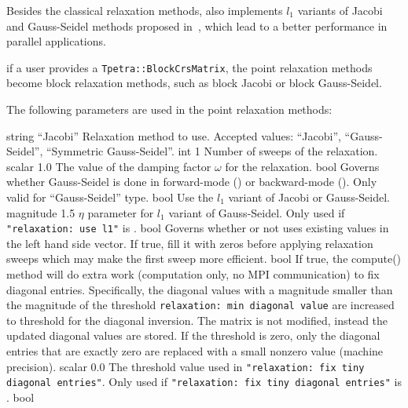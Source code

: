 Besides the classical relaxation methods, \ifpacktwo{} also implements $l_1$
variants of Jacobi and Gauss-Seidel methods proposed in~\cite{Baker2011}, which
lead to a better performance in parallel applications.

 if a user provides a \texttt{Tpetra::BlockCrsMatrix}, the point relaxation
methods become block relaxation methods, such as block Jacobi or block
Gauss-Seidel.

The following parameters are used in the point relaxation methods:

    {string}
    {``Jacobi''}
    {Relaxation method to use. Accepted values: ``Jacobi'',
     ``Gauss-Seidel'', ``Symmetric Gauss-Seidel''.}
    {int}
    {1}
    {Number of sweeps of the relaxation.}
    {scalar}
    {1.0}
    {The value of the damping factor $\omega$ for the relaxation.}
    {bool}
    {\false}
    {Governs whether Gauss-Seidel is done in forward-mode (\false) or
     backward-mode (\true). Only valid for ``Gauss-Seidel'' type.}
    {bool}
    {\false}
    {Use the $l_1$ variant of Jacobi or Gauss-Seidel.}
    {magnitude}
    {1.5}
    {$\eta$ parameter for $l_1$ variant of Gauss-Seidel. Only used if
     {\tt "relaxation: use l1"} is \true.}
    {bool}
    {\true}
    {Governs whether or not \ifpacktwo{} uses existing values in the left hand
     side vector. If true, \ifpacktwo{} fill it with zeros before applying
     relaxation sweeps which may make the first sweep more efficient.}
    {bool}
    {\false}
    {If true, the compute() method will do extra work (computation only, no MPI
     communication) to fix diagonal entries. Specifically, the diagonal values
     with a magnitude smaller than the magnitude of the threshold \texttt{relaxation: min
     diagonal value} are increased to threshold for the diagonal inversion. The
     matrix is not modified, instead the updated diagonal values are stored. If the
     threshold is zero, only the diagonal entries that are exactly zero are replaced
     with a small nonzero value (machine precision).}
    {scalar}
    {0.0}
    {The threshold value used in {\tt "relaxation: fix tiny diagonal entries"}.
     Only used if {\tt "relaxation: fix tiny diagonal entries"} is \true.}
    {bool}
    {\false}
